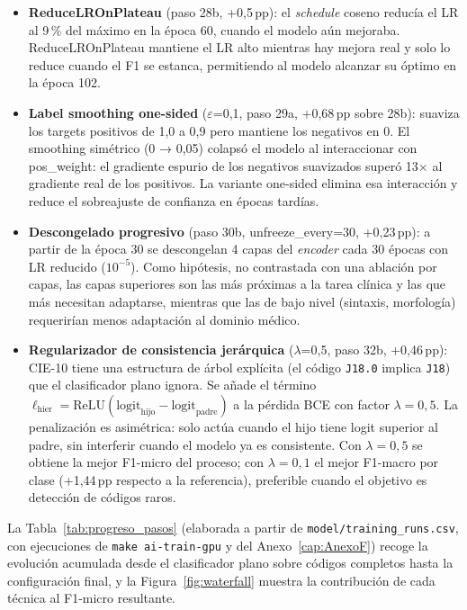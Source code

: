 \begin{itemize}
 \item \textbf{ReduceLROnPlateau} (paso 28b, +0,5\,pp): el \emph{schedule} coseno reducía el LR al 9\,\% del máximo en la época 60, cuando el modelo aún mejoraba. ReduceLROnPlateau mantiene el LR alto mientras hay mejora real y solo lo reduce cuando el F1 se estanca, permitiendo al modelo alcanzar su óptimo en la época 102.

 \item \textbf{Label smoothing one-sided} ($\varepsilon$=0,1, paso 29a, +0,68\,pp sobre 28b): suaviza los targets positivos de 1,0 a 0,9 pero mantiene los negativos en 0. El smoothing simétrico (0 → 0,05) colapsó el modelo al interaccionar con pos\_weight: el gradiente espurio de los negativos suavizados superó 13× al gradiente real de los positivos. La variante one-sided elimina esa interacción y reduce el sobreajuste de confianza en épocas tardías.

 \item \textbf{Descongelado progresivo} (paso 30b, unfreeze\_every=30, +0,23\,pp): a partir de la época 30 se descongelan 4 capas del \emph{encoder} cada 30 épocas con LR reducido ($10^{-5}$). Como hipótesis, no contrastada con una ablación por capas, las capas superiores son las más próximas a la tarea clínica y las que más necesitan adaptarse, mientras que las de bajo nivel (sintaxis, morfología) requerirían menos adaptación al dominio médico.

 \item \textbf{Regularizador de consistencia jerárquica} ($\lambda$=0,5, paso 32b, +0,46\,pp): CIE-10 tiene una estructura de árbol explícita (el código \texttt{J18.0} implica \texttt{J18}) que el clasificador plano ignora. Se añade el término $\ell_\text{hier} = \text{ReLU}(\text{logit}_\text{hijo} - \text{logit}_\text{padre})$ a la pérdida BCE con factor $\lambda=0{,}5$. La penalización es asimétrica: solo actúa cuando el hijo tiene logit superior al padre, sin interferir cuando el modelo ya es consistente. Con $\lambda=0{,}5$ se obtiene la mejor F1-micro del proceso; con $\lambda=0{,}1$ el mejor F1-macro por clase (+1,44\,pp respecto a la referencia), preferible cuando el objetivo es detección de códigos raros.
\end{itemize}

La Tabla~\ref{tab:progreso_pasos} (elaborada a partir de \texttt{model/\allowbreak{}training\_runs.csv}, con ejecuciones de \texttt{make ai-train-gpu} y del Anexo~\ref{cap:AnexoF}) recoge la evolución acumulada desde el clasificador plano sobre códigos completos hasta la configuración final, y la Figura~\ref{fig:waterfall} muestra la contribución de cada técnica al F1-micro resultante.

